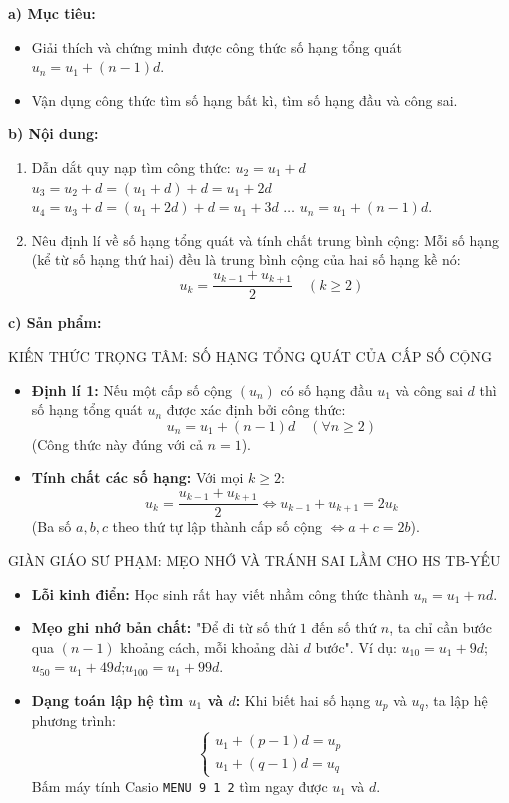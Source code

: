 \documentclass[12pt, a4paper]{article}
\begin{document}
\noindent \textbf{a) Mục tiêu:}  
\begin{itemize}[leftmargin=0.8cm]  
    \item Giải thích và chứng minh được công thức số hạng tổng quát $u_n = u_1 + (n - 1)d$.  
    \item Vận dụng công thức tìm số hạng bất kì, tìm số hạng đầu và công sai.  
\end{itemize}  
  
\noindent \textbf{b) Nội dung:}  
\begin{enumerate}[leftmargin=0.6cm]  
    \item Dẫn dắt quy nạp tìm công thức:  
    $u_2 = u_1 + d$  
    $u_3 = u_2 + d = (u_1 + d) + d = u_1 + 2d$  
    $u_4 = u_3 + d = (u_1 + 2d) + d = u_1 + 3d$  
    $\dots$  
    $u_n = u_1 + (n - 1)d$.  
    \item Nêu định lí về số hạng tổng quát và tính chất trung bình cộng: Mỗi số hạng (kể từ số hạng thứ hai) đều là trung bình cộng của hai số hạng kề nó:  
    $$u_k = \dfrac{u_{k-1} + u_{k+1}}{2} \quad (k \ge 2)$$  
\end{enumerate}  
  
\noindent \textbf{c) Sản phẩm:}  
  
\begin{pedabox}{KIẾN THỨC TRỌNG TÂM: SỐ HẠNG TỔNG QUÁT CỦA CẤP SỐ CỘNG}  
\begin{itemize}[leftmargin=0.6cm]  
    \item \textbf{Định lí 1:} Nếu một cấp số cộng $(u_n)$ có số hạng đầu $u_1$ và công sai $d$ thì số hạng tổng quát $u_n$ được xác định bởi công thức:  
    $$u_n = u_1 + (n - 1)d \quad (\forall n \ge 2)$$  
    (Công thức này đúng với cả $n = 1$).  
    \item \textbf{Tính chất các số hạng:} Với mọi $k \ge 2$:  
    $$u_k = \dfrac{u_{k-1} + u_{k+1}}{2} \iff u_{k-1} + u_{k+1} = 2u_k$$  
    (Ba số $a, b, c$ theo thứ tự lập thành cấp số cộng $\iff a + c = 2b$).  
\end{itemize}  
\end{pedabox}  
  
\begin{scaffoldbox}{GIÀN GIÁO SƯ PHẠM: MẸO NHỚ VÀ TRÁNH SAI LẦM CHO HS TB-YẾU}  
\begin{itemize}[leftmargin=0.6cm]  
    \item \textbf{Lỗi kinh điển:} Học sinh rất hay viết nhầm công thức thành $u_n = u_1 + nd$.  
    \item \textbf{Mẹo ghi nhớ bản chất:} "Để đi từ số thứ $1$ đến số thứ $n$, ta chỉ cần bước qua $(n - 1)$ khoảng cách, mỗi khoảng dài $d$ bước".  
    Ví dụ:  
    $u_{10} = u_1 + 9d$;\quad $u_{50} = u_1 + 49d$;\quad $u_{100} = u_1 + 99d$.  
    \item \textbf{Dạng toán lập hệ tìm $u_1$ và $d$:} Khi biết hai số hạng $u_p$ và $u_q$, ta lập hệ phương trình:  
    $$\begin{cases} u_1 + (p - 1)d = u_p \\ u_1 + (q - 1)d = u_q \end{cases}$$  
    Bấm máy tính Casio \texttt{MENU 9 1 2} tìm ngay được $u_1$ và $d$.  
\end{itemize}  
\end{scaffoldbox}  
  
\end{document}
